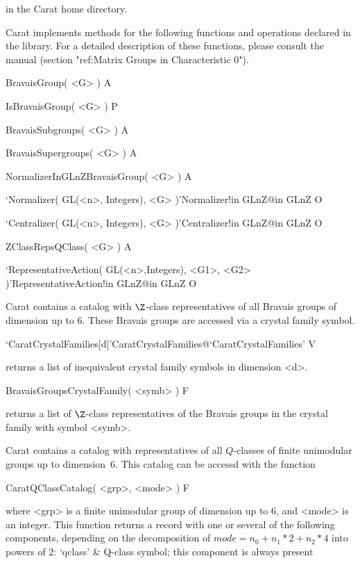 in the Carat home directory.



Carat implements methods for the following functions and operations
declared in the {\GAP} library. For a detailed description of these
functions, please consult the {\GAP} manual (section "ref:Matrix Groups
in Characteristic 0").

\>BravaisGroup( <G> ) A

\>IsBravaisGroup( <G> ) P

\>BravaisSubgroups( <G> ) A

\>BravaisSupergroups( <G> ) A

\>NormalizerInGLnZBravaisGroup( <G> ) A

\>`Normalizer( GL(<n>, Integers), <G> )'{Normalizer!in GLnZ}@{in GLnZ} O

\>`Centralizer( GL(<n>, Integers), <G> )'{Centralizer!in GLnZ}@{in GLnZ} O

\>ZClassRepsQClass( <G> ) A

\>`RepresentativeAction( GL(<n>,Integers), <G1>, <G2> )'{RepresentativeAction!in GLnZ}@{in GLnZ} O



Carat contains a catalog with $\Z$-class representatives of all
Bravais groups of dimension up to 6. These Bravais groups are
accessed via a crystal family symbol.

\>`CaratCrystalFamilies[d]'{CaratCrystalFamilies}@{`CaratCrystalFamilies'} V

returns a list of inequivalent crystal family symbols in dimension <d>.

\>BravaisGroupsCrystalFamily( <symb> ) F

returns a list of $\Z$-class representatives of the Bravais groups
in the crystal family with symbol <symb>.


Carat contains a catalog with representatives of all $Q$-classes of
finite unimodular groups up to dimension~6. This catalog can be accessd
with the function

\>CaratQClassCatalog( <grp>, <mode> ) F

where <grp> is a finite unimodular group of dimension up to 6, and
<mode> is an integer. This function returns a record with one or
several of the following components, depending on the decomposition of
$mode = n_{0} + n_{1} * 2 + n_{2} * 4$ into powers of 2:
\beginitems
`qclass'     & Q-class symbol; this component is always present

